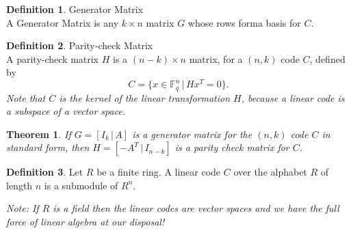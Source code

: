 \documentclass{article}
\newcommand{\F}{\mathbb{F}}
\newtheorem{theorem}{Theorem}
\theoremstyle{definition}
\newtheorem{definition}{Definition}
\begin{document}
\begin{definition}{Generator Matrix}\\
  A Generator Matrix is any $k\times n$ matrix $G$ whose rows forma  basis for $C$.
\end{definition}

\begin{definition}{Parity-check Matrix}\\
  A parity-check matrix $H$ is a $(n-k)\times n$ matrix, for a $(n,k)$ code $C$, defined by \[C = \Big\{x\in\F^n_q \,|\, Hx^T = 0\Big\}.\] \textit{Note that $C$ is the kernel of the linear transformation $H$, because a linear code is a subspace of a vector space.}
\end{definition}

\begin{theorem}
  If $G = [I_k \,|\, A]$ is a generator matrix for the $(n,k)$ code $C$ in standard form, then $H = [-A^T \,|\, I_{n-k}]$ is a parity check matrix for $C$.
\end{theorem}

\begin{definition}
  Let $R$ be a finite ring. A linear code $C$ over the alphabet $R$ of length $n$ is a submodule of $R^n$.
\end{definition}
\textit{Note: If $R$ is a field then the linear codes are vector spaces and we have the full force of linear algebra at our disposal!}
\end{document}
